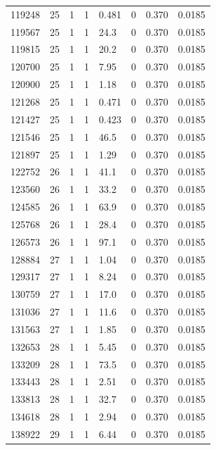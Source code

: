 \documentclass[preview]{standalone}
\begin{document}
{{{{{{{{{{{{{{{{\begin{tabular}{L{1.2cm}C{1.2cm} C{0.3cm}C{0.5cm} C{1.4cm}C{1.4cm} C{1.4cm}C{1.4cm}}
  119248  &    25  & 1     &  1 &  0.481  & 0  & 0.370 &  0.0185   \\ 
  119567  &    25  & 1     &  1 &  24.3  & 0  & 0.370 &  0.0185   \\ 
  119815  &    25  & 1     &  1 &  20.2  & 0  & 0.370 &  0.0185   \\ 
  120700  &    25  & 1     &  1 &  7.95  & 0  & 0.370 &  0.0185   \\ 
  120900  &    25  & 1     &  1 &  1.18  & 0  & 0.370 &  0.0185   \\ 
  121268  &    25  & 1     &  1 &  0.471  & 0  & 0.370 &  0.0185   \\ 
  121427  &    25  & 1     &  1 &  0.423  & 0  & 0.370 &  0.0185   \\ 
  121546  &    25  & 1     &  1 &  46.5  & 0  & 0.370 &  0.0185   \\ 
  121897  &    25  & 1     &  1 &  1.29  & 0  & 0.370 &  0.0185   \\ 
  122752  &    26  & 1     &  1 &  41.1  & 0  & 0.370 &  0.0185   \\ 
  123560  &    26  & 1     &  1 &  33.2  & 0  & 0.370 &  0.0185   \\ 
  124585  &    26  & 1     &  1 &  63.9  & 0  & 0.370 &  0.0185   \\ 
  125768  &    26  & 1     &  1 &  28.4  & 0  & 0.370 &  0.0185   \\ 
  126573  &    26  & 1     &  1 &  97.1  & 0  & 0.370 &  0.0185   \\ 
  128884  &    27  & 1     &  1 &  1.04  & 0  & 0.370 &  0.0185   \\ 
  129317  &    27  & 1     &  1 &  8.24  & 0  & 0.370 &  0.0185   \\ 
  130759  &    27  & 1     &  1 &  17.0  & 0  & 0.370 &  0.0185   \\ 
  131036  &    27  & 1     &  1 &  11.6  & 0  & 0.370 &  0.0185   \\ 
  131563  &    27  & 1     &  1 &  1.85  & 0  & 0.370 &  0.0185   \\ 
  132653  &    28  & 1     &  1 &  5.45  & 0  & 0.370 &  0.0185   \\ 
  133209  &    28  & 1     &  1 &  73.5  & 0  & 0.370 &  0.0185   \\ 
  133443  &    28  & 1     &  1 &  2.51  & 0  & 0.370 &  0.0185   \\ 
  133813  &    28  & 1     &  1 &  32.7  & 0  & 0.370 &  0.0185   \\ 
  134618  &    28  & 1     &  1 &  2.94  & 0  & 0.370 &  0.0185   \\ 
  138922  &    29  & 1     &  1 &  6.44  & 0  & 0.370 &  0.0185   \\ 
\hline 
\end{tabular} 

}}}}}}}}}}}}}}}}
\end{document}
